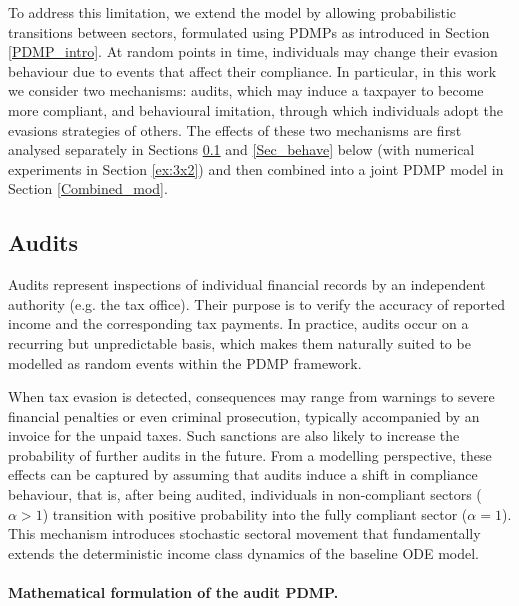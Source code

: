 \documentclass[11pt]{article}
\theoremstyle{plain}
\theoremstyle{definition}
\newcommand{\1}{\mathbf{1}}
\begin{document}
To address this limitation, we extend the model by allowing probabilistic transitions between sectors, formulated using PDMPs as introduced in Section \ref{PDMP_intro}. At random points in time, individuals may change their evasion behaviour due to events that affect their compliance. In particular, in this work we consider two mechanisms: audits, which may induce a taxpayer to become more compliant, and behavioural imitation,
through which individuals adopt the evasions strategies of others. The effects of these two mechanisms are first analysed separately in Sections \ref{audit_sec} and \ref{Sec_behave} below (with numerical experiments in Section \ref{ex:3x2}) and then combined into a joint PDMP model in Section \ref{Combined_mod}.

\subsection{Audits}
\label{audit_sec}

Audits represent inspections of individual financial records by an independent authority (e.g. the tax office). Their purpose is to verify the accuracy of reported income and the corresponding tax payments. In practice, audits occur on a recurring but unpredictable basis, which makes them naturally suited to be modelled as random events within the PDMP framework.

When tax evasion is detected, consequences may range from warnings to severe financial penalties or even criminal prosecution, typically accompanied by an invoice for the unpaid taxes. Such sanctions are also likely to increase the probability of further audits in the future. From a modelling perspective, these effects can be captured by assuming that audits induce a shift in compliance behaviour, that is, after being audited, individuals in non-compliant sectors ($\alpha>1$) transition with positive probability into the fully compliant sector ($\alpha=1$). This mechanism introduces stochastic sectoral movement that fundamentally extends the deterministic income class dynamics of the baseline ODE model.

\paragraph{Mathematical formulation of the audit PDMP.}
\end{document}
